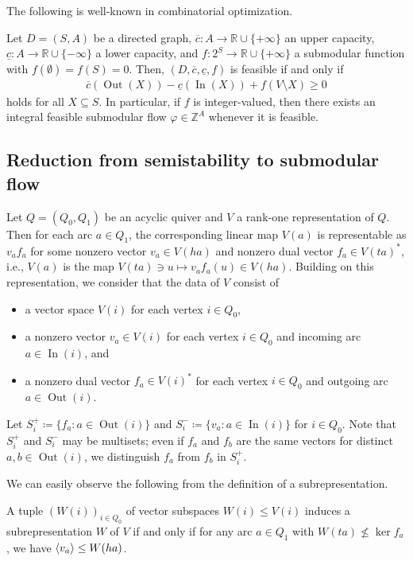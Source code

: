 \documentclass[a4paper,11pt]{article}
\numberwithin{equation}{section}
\newcommand{\R}{\mathbb{R}}
\newcommand{\Z}{\mathbb{Z}}
\DeclareMathOperator{\In}{In}
\DeclareMathOperator{\Out}{Out}
\DeclarePairedDelimiter{\spnn}{\langle}{\rangle}
\begin{document}
The following is well-known in combinatorial optimization.
\begin{theorem}\label{thm:chara:submodular-flow}
Let $D = (S, A)$ be a directed graph, $\overline{c} : A \to \R \cup \{+\infty\}$ an upper capacity, $\underline{c} : A \to \R \cup \{-\infty\}$ a lower capacity, and $f : 2^S \to \R \cup \{+\infty\}$ a submodular function with $f(\emptyset) = f(S) = 0$.
Then,
$(D, \overline{c}, \underline{c}, f)$ is feasible if and only if
\begin{align}
\overline{c}(\Out(X)) - \underline{c}(\In(X)) + f(V \setminus X) \geq 0
\end{align}
holds for all $X \subseteq S$.
In particular, if $f$ is integer-valued,
then there exists an integral feasible submodular flow $\varphi \in \Z^A$ whenever it is feasible.
\end{theorem}




\subsection{Reduction from semistability to submodular flow}
Let $Q = (Q_0, Q_1)$ be an acyclic quiver
and $V$ a rank-one representation of $Q$.
Then for each arc $a \in Q_1$,
the corresponding linear map $V(a)$ is representable as $v_a f_a$ for some nonzero vector $v_a \in V(ha)$ and nonzero dual vector $f_a \in V(ta)^*$,
i.e.,
$V(a)$ is the map $V(ta) \ni u \mapsto v_af_a(u) \in V(ha)$.
Building on this representation,
we consider that
the data of $V$ consist of
\begin{itemize}
    \item a vector space $V(i)$ for each vertex $i \in Q_0$,
    \item a nonzero vector $v_a \in V(i)$ for each vertex $i \in Q_0$ and incoming arc $a \in \In(i)$, and
    \item a nonzero dual vector $f_a \in V(i)^*$ for each vertex $i \in Q_0$ and outgoing arc $a \in \Out(i)$.
\end{itemize}
Let $S_i^+ \coloneqq \{ f_a : a \in \Out(i) \}$ and $S_i^- \coloneqq \{ v_a : a \in \In(i) \}$ for $i \in Q_0$.
Note that $S_i^+$ and $S_i^-$ may be multisets;
even if $f_a$ and $f_b$ are the same vectors for distinct $a,b \in \Out(i)$,
we distinguish $f_a$ from $f_b$ in $S_i^+$.

We can easily observe the following from the definition of a subrepresentation.
\begin{lemma}\label{lem:subrep}
    A tuple $(W(i))_{i \in Q_0}$ of vector subspaces $W(i) \leq V(i)$ induces a subrepresentation $W$ of $V$
    if and only if for any arc $a \in Q_1$ with
    $W(ta) \not\leq \ker f_a$, we have $\spnn{v_a} \leq W(ha)$.
\end{lemma}
\end{document}
